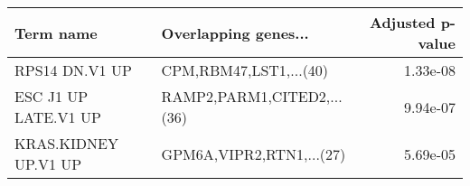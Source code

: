 \begin{tabular}{llr}
\toprule
           Term name &       Overlapping genes... &  Adjusted p-value \\
\midrule
      RPS14 DN.V1 UP &     CPM,RBM47,LST1,...(40) &          1.33e-08 \\
ESC J1 UP LATE.V1 UP & RAMP2,PARM1,CITED2,...(36) &          9.94e-07 \\
KRAS.KIDNEY UP.V1 UP &   GPM6A,VIPR2,RTN1,...(27) &          5.69e-05 \\
\bottomrule
\end{tabular}
